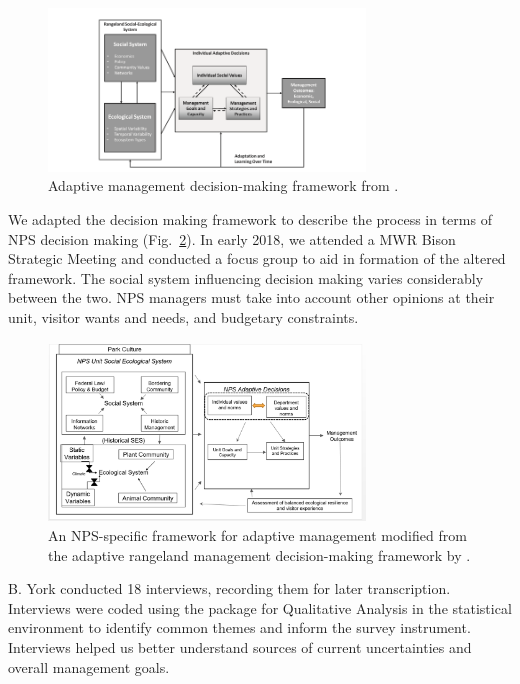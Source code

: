 \begin{figure}[t]
	\centering
	\includegraphics[width=0.75\textwidth]{figures/LubellFramework.png}\caption[The adaptive management framework from \citet{lubell2013}.]{Adaptive management decision-making framework from \citet{lubell2013}. } \label{LubellFramework}
\end{figure}

We adapted the decision making framework to describe the process in terms of NPS decision making (Fig.~\ref{NPSframework}).
In early 2018, we attended a MWR Bison Strategic Meeting and conducted a focus group to aid in formation of the altered framework. 
The social system influencing decision making varies considerably between the two. 
NPS managers must take into account other opinions at their unit, visitor wants and needs, and budgetary constraints.

\begin{figure}[t]
	\centering
	\includegraphics[width=0.75\textwidth]{figures/NPSframework.png}\caption[A modified, NPS-specific adaptive management framework.]{An NPS-specific framework for adaptive management modified from the adaptive rangeland management decision-making framework by \citet[][see fig.~\ref{LubellFramework}]{lubell2013}.} \label{NPSframework}
\end{figure}

B. York conducted 18 interviews, recording them for later transcription.
Interviews were coded using the  package for Qualitative Analysis in the \R statistical environment  \citep{rcoreteam2017,huang2018} to identify common themes and inform the survey instrument.
Interviews helped us better understand sources of current uncertainties and overall management goals.

